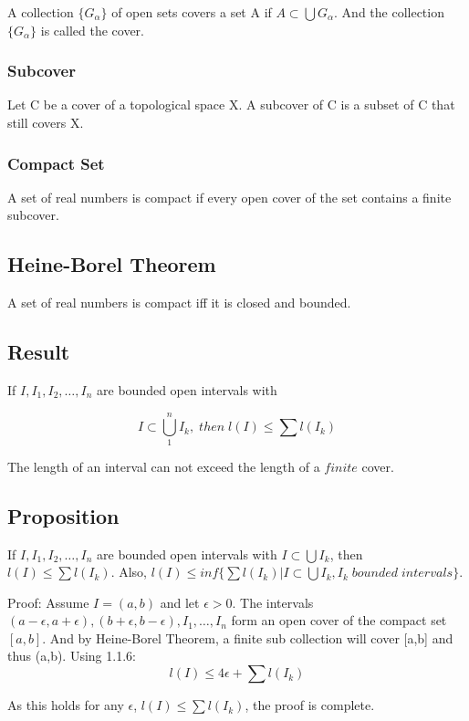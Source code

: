 \documentclass{article}
\begin{document}
 A collection $\{G_{\alpha}\}$ of open sets covers a set A if $A \subset \bigcup G_{\alpha}$. And the collection $\{G_{\alpha}\}$ is called the cover.
 
 \subsubsection{Subcover}
 
 Let C be a cover of a topological space X. A subcover of C is a subset of C that still covers X.
 
 \subsubsection{Compact Set}
 
A set of real numbers is compact if every open cover of the set contains a finite subcover.

\subsection{Heine-Borel Theorem}
A set of real numbers is compact iff it is closed and bounded.

\subsection{Result}
If $I,I_1,I_2,\dots ,I_n$ are bounded open intervals with 

$$ I \subset \bigcup_{1}^{n}I_k ,\; then  \;l(I) \leq \sum l(I_k)$$

The length of an interval can not exceed the length of a $finite$ cover.

\subsection{Proposition}

If $I,I_1,I_2,\dots ,I_n$ are bounded open intervals with $ I \subset \bigcup I_k$, then $l(I) \leq \sum l(I_k)$. Also, $ l(I) \leq inf\{ \sum l(I_k) | I \subset \bigcup I_k, I_k \; bounded \; intervals \}$.

Proof: Assume $I =(a,b)$ and let $\epsilon > 0$. The intervals $(a-\epsilon,a+\epsilon),(b+\epsilon,b-\epsilon),I_1,\dots ,I_n$ form an open cover of the compact set $[a,b]$. And by Heine-Borel Theorem, a finite sub collection will cover [a,b] and thus (a,b).
Using 1.1.6:
$$  l(I) \leq 4\epsilon +  \sum l(I_k)$$

As this holds for any $\epsilon$, $l(I) \leq \sum l(I_k)$, the proof is complete.
\end{document}
